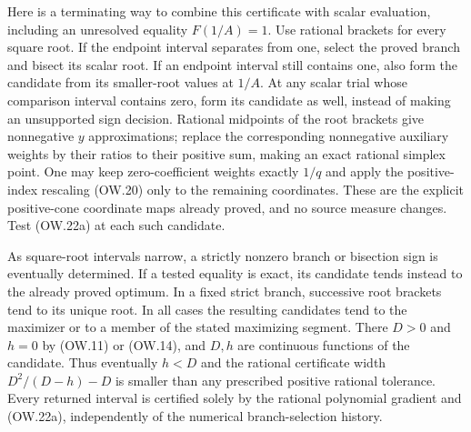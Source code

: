 Here is a terminating way to combine this certificate with scalar
evaluation, including an unresolved equality $F(1/A)=1$.
Use rational brackets for every square root. If the endpoint interval
separates from one, select the proved branch and bisect its scalar
root. If an endpoint interval still contains one, also form the
candidate from its smaller-root values at $1/A$. At any scalar
trial whose comparison interval contains zero, form its candidate
as well, instead of making an unsupported sign decision. Rational
midpoints of the root brackets give nonnegative $y$ approximations;
replace the corresponding nonnegative auxiliary weights by their
ratios to their positive sum, making an exact rational simplex
point. One may keep zero-coefficient weights exactly $1/q$ and
apply the positive-index rescaling (OW.20) only to the remaining
coordinates. These are the explicit positive-cone coordinate maps
already proved, and no source measure changes. Test (OW.22a) at
each such candidate.

As square-root intervals narrow, a strictly nonzero branch or
bisection sign is eventually determined. If a tested equality is
exact, its candidate tends instead to the already proved optimum.
In a fixed strict branch, successive root brackets tend to its
unique root. In all cases the resulting candidates tend to the
maximizer or to a member of the stated maximizing segment.
There $D>0$ and $h=0$ by (OW.11) or (OW.14), and $D,h$ are
continuous functions of the candidate. Thus eventually $h<D$ and
the rational certificate width $D^2/(D-h)-D$ is smaller than any
prescribed positive rational tolerance. Every returned interval is
certified solely by the rational polynomial gradient and (OW.22a),
independently of the numerical branch-selection history.

